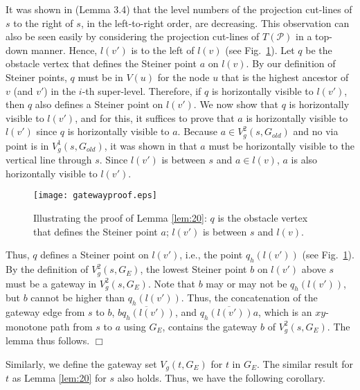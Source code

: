 \documentclass[english,runningheads,11pt]{llncs}
\def\calP{\mathcal{P}}
\newenvironment{proof}{\noindent {\textbf{Proof:}}\rm}{\hfill $\Box$\rm}
\begin{document}
\begin{proof}
It was shown in \cite{ref:ChenSh00} (Lemma 3.4) that the level numbers of the
projection cut-lines of $s$ to the right of $s$,
in the left-to-right order, are decreasing.
This observation can also be seen easily by considering the projection cut-lines of $T(\calP)$ in a top-down manner. Hence,
$l(v')$ is to the left of $l(v)$ (see Fig.~\ref{fig:gatewayproof}). Let $q$ be the obstacle vertex that
defines the Steiner point $a$ on $l(v)$. By our definition of
Steiner points, $q$ must be in $V(u)$ for the
node $u$ that is the highest ancestor of $v$ (and $v'$) in the $i$-th
super-level. Therefore, if $q$ is horizontally visible to
$l(v')$, then $q$ also defines a Steiner point on $l(v')$. We now show
that $q$ is horizontally visible to $l(v')$, and for this,
it suffices to prove
that $a$ is horizontally visible to $l(v')$ since $q$ is horizontally visible to $a$.
Because $a \in V^2_g(s,G_{old})$ and no via point is in $V^1_g(s,G_{old})$,
it was shown in \cite{ref:ChenSh00} that
$a$ must be horizontally visible to the vertical line through $s$. Since
$l(v')$ is between $s$ and $a\in l(v)$, $a$ is also horizontally
visible to $l(v')$.

\begin{figure}[t]
\begin{minipage}[t]{\linewidth}
\begin{center}
\texttt{[image: gatewayproof.eps]}
\caption{\footnotesize Illustrating the proof of Lemma \ref{lem:20}:
$q$ is the obstacle vertex that defines the Steiner point $a$; $l(v')$
is between $s$ and $l(v)$.}
\label{fig:gatewayproof}
\end{center}
\end{minipage}
\vspace*{-0.15in}
\end{figure}

Thus, $q$ defines a Steiner point on $l(v')$, i.e., the point
$q_h(l(v'))$ (see Fig.~\ref{fig:gatewayproof}).
By the definition of $V^2_g(s,G_E)$, the
lowest Steiner point $b$ on $l(v')$ above $s$ must be a gateway in
$V^2_g(s,G_E)$. Note that $b$ may or may not be $q_h(l(v'))$, but $b$
cannot be higher than $q_h(l(v'))$. Thus, the concatenation of the
gateway edge from $s$ to $b$, $\overline{bq_h(l(v'))}$, and
$\overline{q_h(l(v'))a}$, which is an $xy$-monotone path from $s$ to
$a$ using $G_E$, contains the gateway $b$ of $V^2_g(s,G_E)$.
The lemma thus follows.
\end{proof}

Similarly, we define the gateway set $V_g(t,G_E)$ for $t$ in $G_E$.
The similar result for $t$ as Lemma \ref{lem:20} for $s$ also holds. Thus, we have
the following corollary.
\end{document}
